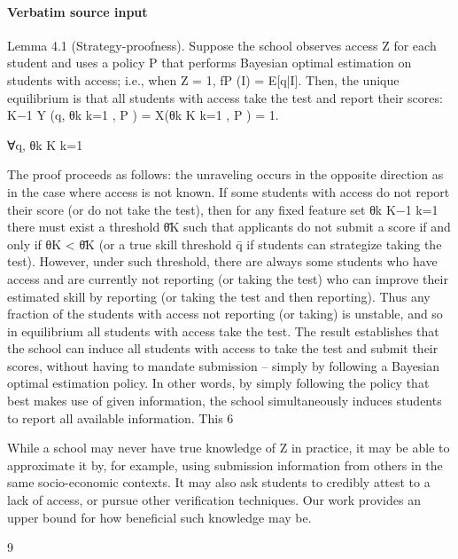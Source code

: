 \documentclass[10pt]{article}
\begin{document}
\paragraph{Verbatim source input}
\begin{ReviewVerbatim}
Lemma 4.1 (Strategy-proofness). Suppose the school observes access Z for each student and uses
a policy P that performs Bayesian optimal estimation on students with access; i.e., when Z = 1,
fP (I) = E[q|I].
Then, the unique equilibrium is that all students with access take the test and report their scores:
K−1
Y (q, {θk }k=1
, P ) = X({θk }K
k=1 , P ) = 1.

∀q, {θk }K
k=1

The proof proceeds as follows: the unraveling occurs in the opposite direction as in the case
where access is not known. If some students with access do not report their score (or do not take the
test), then for any ﬁxed feature set {θk }K−1
k=1 there must exist a threshold θ̄K such that applicants do
not submit a score if and only if θK < θ̄K (or a true skill threshold q̄ if students can strategize taking
the test). However, under such threshold, there are always some students who have access and are
currently not reporting (or taking the test) who can improve their estimated skill by reporting (or
taking the test and then reporting). Thus any fraction of the students with access not reporting (or
taking) is unstable, and so in equilibrium all students with access take the test.
The result establishes that the school can induce all students with access to take the test and
submit their scores, without having to mandate submission – simply by following a Bayesian optimal
estimation policy. In other words, by simply following the policy that best makes use of given
information, the school simultaneously induces students to report all available information. This
6

While a school may never have true knowledge of Z in practice, it may be able to approximate it by, for example,
using submission information from others in the same socio-economic contexts. It may also ask students to credibly
attest to a lack of access, or pursue other verification techniques. Our work provides an upper bound for how beneficial
such knowledge may be.

9



\end{ReviewVerbatim}
\end{document}
